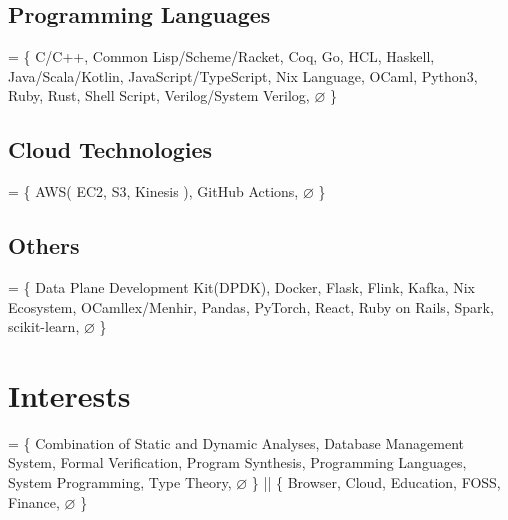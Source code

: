 \documentclass[10pt]{article}
\begin{document}
  \subsection*{Programming Languages}
    = \{
      C/C++,
      Common Lisp/Scheme/Racket,
      Coq,
      Go,
      HCL,
      Haskell,
      Java/Scala/Kotlin,
      JavaScript/TypeScript,
      Nix Language,
      OCaml,
      Python3,
      Ruby,
      Rust,
      Shell Script,
      Verilog/System Verilog,
      $\varnothing$
    \}
  \subsection*{Cloud Technologies}
    = \{
      AWS(
        EC2,
        S3,
        Kinesis
      ),
      GitHub Actions,
      $\varnothing$
    \}
  \subsection*{Others}
    = \{
      Data Plane Development Kit(DPDK),
      Docker,
      Flask,
      Flink,
      Kafka,
      Nix Ecosystem,
      OCamllex/Menhir,
      Pandas,
      PyTorch,
      React,
      Ruby on Rails,
      Spark,
      scikit-learn,
      $\varnothing$
    \}

\section*{Interests}
  = \{
    Combination of Static and Dynamic Analyses,
    Database Management System,
    Formal Verification,
    Program Synthesis,
    Programming Languages,
    System Programming,
    Type Theory,
    $\varnothing$
  \}
  ||
  \{
    Browser,
    Cloud,
    Education,
    FOSS,
    Finance,
    $\varnothing$
  \}
\end{document}
